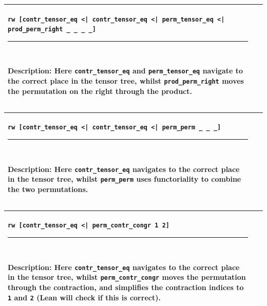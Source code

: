 \documentclass[a4paper, 11pt]{article}
\DeclareRobustCommand{\myinline}{\lstinline}
\newcommand{\proofstep}[3]{
  \arrayrulecolor{mycolor}
\begin{center}
\begin{tabular}{|p{3in}| p{3in}|}
\hline
{#1
}\newline 
\hrule~\newline
#2
  & ~\newline
\makebox[3in]{%
#3}
  \\ \hline
\end{tabular}
\end{center}
\arrayrulecolor{black}
}
\begin{document}
\proofstep{\lstinline!rw [contr_tensor_eq <| contr_tensor_eq <| perm_tensor_eq <| prod_perm_right _ _ _ _]!}{
  Description: Here \myinline|contr_tensor_eq| and \myinline|perm_tensor_eq| navigate to the correct place in the tensor tree,
  whilst \myinline|prod_perm_right| moves the permutation on the right through the product.
}{
  \begin{tikzpicture}
    \node[draw=black] (A) at (0,0) {contr 0 0};
    \node[draw=black] (B) at (0,-1) {contr 0 1};
    \node[draw=black] (C) at (0,-2) {perm \_};
    \node[draw=red] (D) at (0,-3) {perm \_};
    \node[draw=red] (E) at (0,-4) {prod};
    \node[draw=black] (F1) at (-1,-5) {neg};
    \node[draw=black] (G1) at (-1,-6) {A};
    \node[draw=black] (F2) at (1,-5) {S};
    \path [->] (A) edge (B);
    \path [->] (B) edge (C);
    \path [->] (C) edge (D);
    \path [->, color = red] (D) edge (E);
    \path [->] (E) edge (F1);
    \path [->, color = red] (E) edge (F2);
    \path [->] (F1) edge (G1);
  \end{tikzpicture}
}

\proofstep{\lstinline!rw [contr_tensor_eq <| contr_tensor_eq <| perm_perm _ _ _]!}{
  Description: Here \myinline|contr_tensor_eq| navigates to the correct place in the tensor tree,
  whilst \myinline|perm_perm| uses functoriality to combine the two permutations.
}{
  \begin{tikzpicture}
    \node[draw=black] (A) at (0,0) {contr 0 0};
    \node[draw=black] (B) at (0,-1) {contr 0 1};
    \node[draw=red] (C) at (0,-2) {perm \_};
    \node[draw=black] (D) at (0,-3) {prod};
    \node[draw=black] (E1) at (-1,-4) {neg};
    \node[draw=black] (F1) at (-1,-5) {A};
    \node[draw=black] (E2) at (1,-4) {S};
    \path [->] (A) edge (B);
    \path [->] (B) edge (C);
    \path [->] (C) edge (D);
    \path [->] (D) edge (E1);
    \path [->] (D) edge (E2);
    \path [->] (E1) edge (F1);
  \end{tikzpicture}
}

\proofstep{\lstinline!rw [contr_tensor_eq <| perm_contr_congr 1 2]!}{
  Description: Here \myinline|contr_tensor_eq| navigates to the correct place in the tensor tree,
  whilst \myinline|perm_contr_congr| moves the permutation through the contraction, and simplifies the contraction
  indices to \myinline|1| and \myinline|2| (Lean will check if this is correct).
}{
  \begin{tikzpicture}
    \node[draw=black] (A) at (0,0) {contr 0 0};
    \node[draw=red] (B) at (0,-1) {perm \_};
    \node[draw=red] (C) at (0,-2) {contr 1 2};
    \node[draw=black] (D) at (0,-3) {prod};
    \node[draw=black] (E1) at (-1,-4) {neg};
    \node[draw=black] (F1) at (-1,-5) {A};
    \node[draw=black] (E2) at (1,-4) {S};
    \path [->] (A) edge (B);
    \path [->, color = red] (B) edge (C);
    \path [->, color = red] (C) edge (D);
    \path [->] (D) edge (E1);
    \path [->] (D) edge (E2);
    \path [->] (E1) edge (F1);
  \end{tikzpicture}
}
\end{document}
